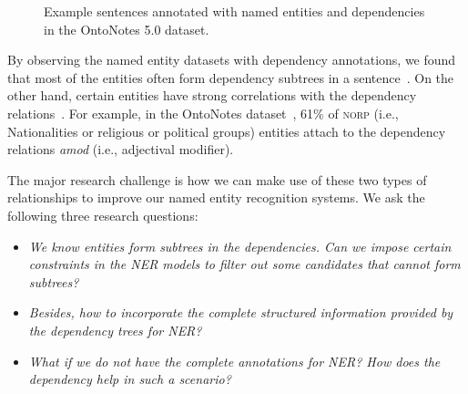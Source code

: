 \begin{figure}[h!]
{ 
	}
	\caption{Example sentences annotated with named entities and dependencies in the OntoNotes 5.0 dataset.}
	\label{fig:examples}
\end{figure}

By observing the named entity datasets with dependency annotations, we found that most of the entities often form dependency subtrees in a sentence~\cite{jie2017efficient}. 
On the other hand, certain entities have strong correlations with the dependency relations~\cite{jie2019dependency}. 
For example, in the OntoNotes dataset~\cite{weischedel2013ontonotes}, 61\% of \textsc{norp} (i.e., Nationalities or religious or political groups) entities attach to the dependency relations \textit{amod} (i.e., adjectival modifier). 

The major research challenge is how we can make use of these two types of relationships to improve our named entity recognition systems. 
We ask the following three research questions: 
\begin{itemize}
	\item \textit{We know entities form subtrees in the dependencies. Can we impose certain constraints in the NER models to filter out some candidates that cannot form subtrees?}
	\item \textit{Besides, how to incorporate the complete structured information provided by the dependency trees for NER?}
	\item \textit{What if we do not have the complete annotations for NER? How does the dependency help in such a scenario?}
\end{itemize}

